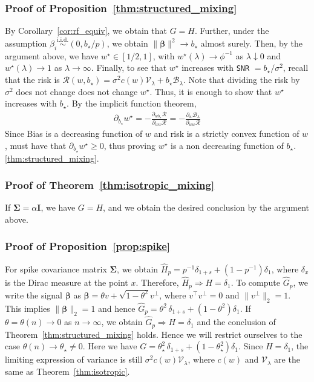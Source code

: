 \documentclass[10pt]{article}
\newcommand{\mv}{\mathcal{V}}
\numberwithin{thm}{section}
\numberwithin{remark}{section}
\numberwithin{ex}{section}
\numberwithin{ass}{section}
\numberwithin{defn}{section}
\numberwithin{lemma}{section}
\numberwithin{corollary}{section}
\numberwithin{prop}{section}
\newcommand{\mb}{\mathcal{B}}
\def \bbeta{\pmb{\beta}}
\newcommand{\bSigma}{ { \Sigma} }
\def\bSigma{{\boldsymbol\Sigma}}
\numberwithin{equation}{section}
\renewcommand{\hat}{\widehat}
\begin{document}
\subsubsection*{Proof of Proposition~\ref{thm:structured_mixing}}

By Corollary~\ref{cor:rf_equiv}, we obtain that $G=H$. Further, under the assumption $\beta_i  \stackrel{\text{i.i.d.}}{\sim} (0, b_{\star}/p)$, we obtain $\|\bbeta\|^2 \to b_{\star}$ almost surely. Then, by the argument above, we have $w^{\star} \in [1/2, 1]$, with $w^{\star}(\lambda) \to \phi^{-1}$ as $\lambda \downarrow 0$ and $w^{\star}(\lambda) \to 1$ as $\lambda \rightarrow \infty$. Finally, to see that $w^{\star}$ increases with \texttt{SNR} $=b_{\star}/\sigma^2$, recall that the risk is $\mathcal R(w,b_{\star}) = \sigma^2 c(w)\mv_\lambda + b_{\star} \mb_\lambda$.
Note that dividing the risk by $\sigma^2$ does not change does not change $w^{\star}$.
Thus, it is enough to show that $w^{\star}$ increases with $b_{\star}$.
By the implicit function theorem,
\begin{align*}
\partial_{b_{\star}} w^{\star} = - \frac{\partial_{w b_{\star}} \mathcal R}{\partial_{ww} \mathcal R} = - \frac{\partial_{w} \mb_\lambda }{\partial_{ww} \mathcal R}
\end{align*}
Since Bias is a decreasing function of $w$ and risk is a strictly convex function of $w$, must have that $\partial_{b_{\star}} w^{\star} \ge 0$, thus proving $w^{\star}$ is a non decreasing function of $b_{\star}$.  \ref{thm:structured_mixing}.

\subsubsection*{Proof of Theorem~\ref{thm:isotropic_mixing}}
If $\bSigma= \alpha\boldsymbol I$, we have $G=H$, and we obtain the desired conclusion by the argument above.

\subsubsection*{Proof of Proposition~\ref{prop:spike}}
For spike covariance matrix $\bSigma$, we obtain $\hat H_p=  p^{-1} \delta_{1+s}+ (1-p^{-1}) \delta_{1}$, where $\delta_{x}$ is the Dirac measure at the point $x$. Therefore, $\hat H_p \Rightarrow H = \delta_1$. To compute $\hat G_p$, we write the signal $\bbeta$ as $\bbeta=\theta v+ \sqrt{1-\theta^2}v^{\perp}$, where $v^\top v^\perp =0$ and $\|v^\perp\|_2=1$.
This implies $\|\bbeta\|_2 = 1$ and hence $\hat G_p= \theta^2 \, \delta_{1+s} + (1-\theta^2) \delta_{1}$. If $\theta = \theta(n) \rightarrow 0$ as $n \rightarrow \infty$, we obtain $\hat G_p \Rightarrow H= \delta_1$ and the conclusion of Theorem~\ref{thm:structured_mixing} holds. Hence we will restrict ourselves to the case $\theta(n) \rightarrow \theta_\star \neq 0$. Here we have $G= \theta_\star^2 \, \delta_{1+s}+ \left( 1- \theta_\star^2 \right) \delta_1$. Since $H =\delta_1$, the limiting expression of variance is still $\sigma^2 c(w) \mathcal{V}_\lambda$, where $c(w)$ and $\mathcal{V}_\lambda$ are the same as Theorem~\ref{thm:isotropic}.
\end{document}
